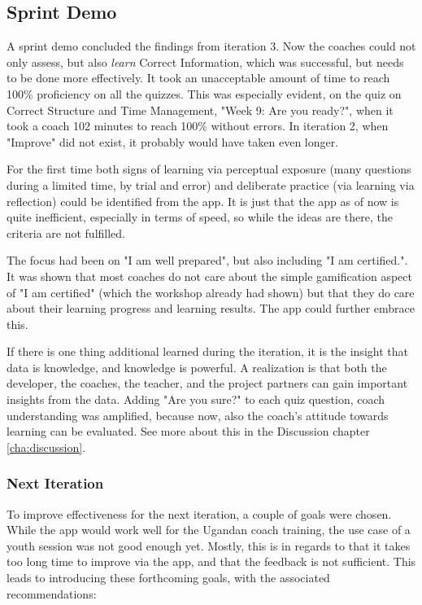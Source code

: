 \subsection{Sprint Demo}

  A sprint demo concluded the findings from iteration 3. Now the coaches could not only assess, but also \textit{learn} Correct Information, which was successful, but needs to be done more effectively. It took an unacceptable amount of time to reach 100\% proficiency on all the quizzes. This was especially evident, on the quiz on Correct Structure and Time Management, "Week 9: Are you ready?", when it took a coach 102 minutes to reach 100\% without errors. In iteration 2, when "Improve" did not exist, it probably would have taken even longer.

  For the first time both signs of learning via perceptual exposure (many questions during a limited time, by trial and error) and deliberate practice (via learning via reflection) could be identified from the app. It is just that the app as of now is quite inefficient, especially in terms of speed, so while the ideas are there, the criteria are not fulfilled.

  The focus had been on "I am well prepared", but also including "I am certified.". It was shown that most coaches do not care about the simple gamification aspect of "I am certified" (which the workshop already had shown) but that they do care about their learning progress and learning results. The app could further embrace this.

  If there is one thing additional learned during the iteration, it is the insight that data is knowledge, and knowledge is powerful. A realization is that both the developer, the coaches, the teacher, and the project partners can gain important insights from the data. Adding "Are you sure?" to each quiz question, coach understanding was amplified, because now, also the coach's attitude towards learning can be evaluated. See more about this in the Discussion chapter \ref{cha:discussion}.

  \subsubsection{Next Iteration}
  To improve effectiveness for the next iteration, a couple of goals were chosen. While the app would work well for the Ugandan coach training, the use case of a youth session was not good enough yet. Mostly, this is in regards to that it takes too long time to improve via the app, and that the feedback is not sufficient. This leads to introducing these forthcoming goals, with the associated recommendations:

